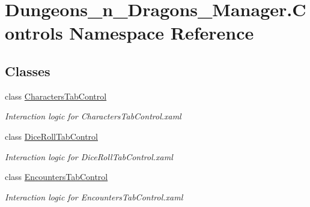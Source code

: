 \hypertarget{namespace_dungeons__n___dragons___manager_1_1_controls}{}\section{Dungeons\+\_\+n\+\_\+\+Dragons\+\_\+\+Manager.\+Controls Namespace Reference}
\label{namespace_dungeons__n___dragons___manager_1_1_controls}
\subsection*{Classes}
\begin{DoxyCompactItemize}
\item 
class \mbox{\hyperlink{class_dungeons__n___dragons___manager_1_1_controls_1_1_characters_tab_control}{Characters\+Tab\+Control}}
\begin{DoxyCompactList}\small\item\em Interaction logic for Characters\+Tab\+Control.\+xaml \end{DoxyCompactList}\item 
class \mbox{\hyperlink{class_dungeons__n___dragons___manager_1_1_controls_1_1_dice_roll_tab_control}{Dice\+Roll\+Tab\+Control}}
\begin{DoxyCompactList}\small\item\em Interaction logic for Dice\+Roll\+Tab\+Control.\+xaml \end{DoxyCompactList}\item 
class \mbox{\hyperlink{class_dungeons__n___dragons___manager_1_1_controls_1_1_encounters_tab_control}{Encounters\+Tab\+Control}}
\begin{DoxyCompactList}\small\item\em Interaction logic for Encounters\+Tab\+Control.\+xaml \end{DoxyCompactList}\end{DoxyCompactItemize}

